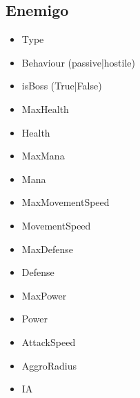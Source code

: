 
\subsection{Enemigo}
\begin{itemize}
    \item Type
    \item Behaviour (passive|hostile)
    \item isBoss (True|False)
    \item MaxHealth
    \item Health
    \item MaxMana
    \item Mana
    \item MaxMovementSpeed
    \item MovementSpeed
    \item MaxDefense
    \item Defense
    \item MaxPower
    \item Power
    \item AttackSpeed
    \item AggroRadius
    \item IA
\end{itemize}